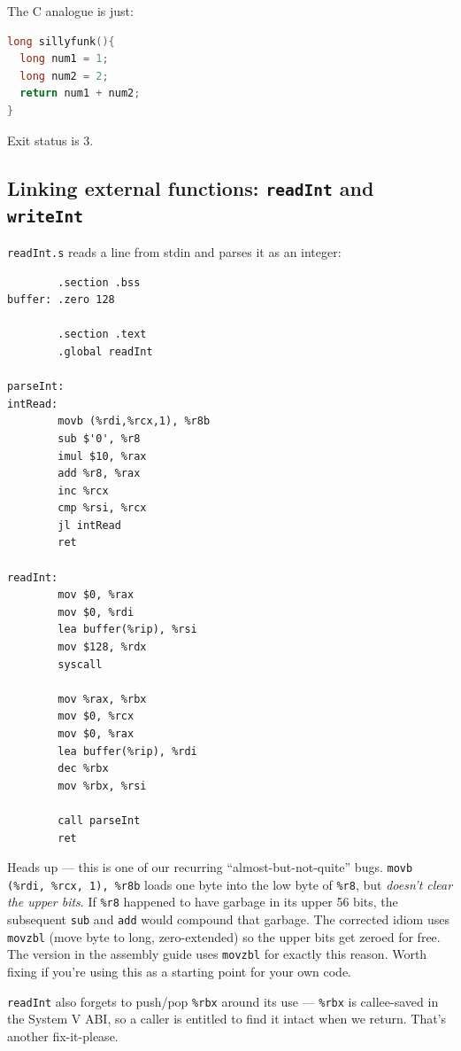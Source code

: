 \documentclass[11pt]{article}
\begin{document}
The C analogue is just:

\begin{lstlisting}[language=C]
long sillyfunk(){
  long num1 = 1;
  long num2 = 2;
  return num1 + num2;
}
\end{lstlisting}

Exit status is 3.

\subsection*{Linking external functions: \texttt{readInt} and \texttt{writeInt}}

\texttt{readInt.s} reads a line from stdin and parses it as an
integer:

\begin{lstlisting}
        .section .bss
buffer: .zero 128

        .section .text
        .global readInt

parseInt:
intRead:
        movb (%rdi,%rcx,1), %r8b
        sub $'0', %r8
        imul $10, %rax
        add %r8, %rax
        inc %rcx
        cmp %rsi, %rcx
        jl intRead
        ret

readInt:
        mov $0, %rax
        mov $0, %rdi
        lea buffer(%rip), %rsi
        mov $128, %rdx
        syscall

        mov %rax, %rbx
        mov $0, %rcx
        mov $0, %rax
        lea buffer(%rip), %rdi
        dec %rbx
        mov %rbx, %rsi

        call parseInt
        ret
\end{lstlisting}

Heads up --- this is one of our recurring ``almost-but-not-quite''
bugs. \texttt{movb (\%rdi, \%rcx, 1), \%r8b} loads one byte into
the low byte of \texttt{\%r8}, but \emph{doesn't clear the upper
bits}. If \texttt{\%r8} happened to have garbage in its upper 56
bits, the subsequent \texttt{sub} and \texttt{add} would compound
that garbage. The corrected idiom uses \texttt{movzbl} (move byte
to long, zero-extended) so the upper bits get zeroed for free. The
version in the assembly guide uses \texttt{movzbl} for exactly
this reason. Worth fixing if you're using this as a starting point
for your own code.

\texttt{readInt} also forgets to push/pop \texttt{\%rbx} around its
use --- \texttt{\%rbx} is callee-saved in the System V ABI, so a
caller is entitled to find it intact when we return. That's another
fix-it-please.
\end{document}
